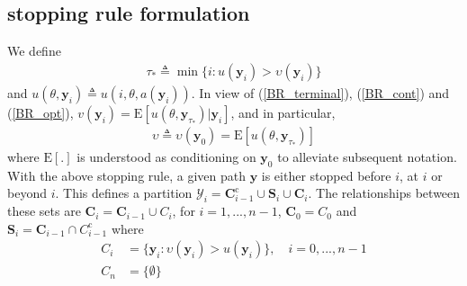 \documentclass{article}
\begin{document}
\subsection{stopping rule formulation}
We define
\begin{align}\label{tau_*}
\tau_*\triangleq\min\{i: u(\mathbf{y}_i)>\upsilon(\mathbf{y}_i)\}
\end{align}and $u(\theta,\mathbf{y}_i)\triangleq
u(i,\theta,a(\mathbf{y}_i))$. In view of (\ref{BR_terminal}),
(\ref{BR_cont}) and (\ref{BR_opt}),
$v(\mathbf{y}_i)=\mathrm{E}[u(\theta,\mathbf{y}_{\tau_*})|\mathbf{y}_i]$,
and in particular,
\begin{eqnarray}\label{opt_cont}
\upsilon\triangleq\upsilon(\mathbf{y}_0)=\mathrm{E}[u(\theta,\mathbf{y}_{\tau_*})]
\end{eqnarray}where $\mathrm{E}[.]$ is understood as conditioning on
$\mathbf{y}_0$ to alleviate subsequent notation. With the above
stopping rule, a given path $\mathbf{y}$ is either stopped before
$i$, at $i$ or beyond $i$. This defines a partition
$\boldsymbol{\mathcal{Y}}_i=\mathbf{C}_{i-1}^{\mathrm{c}}\cup\mathbf{S}_i
\cup \mathbf{C}_i$. The relationships between these sets are
$\mathbf{C}_i=\mathbf{C}_{i-1}\cup C_{i}$, for $i=1,...,n-1$,
$\mathbf{C}_0=C_{0}$ and $\mathbf{S}_i=\mathbf{C}_{i-1}\cap
C_{i-1}^{\mathrm{c}}$ where
\begin{align}\label{C_i} C_i &=\{\mathbf{y}_{i}:
\upsilon(\mathbf{y}_i)>u(\mathbf{y}_i)\}, \quad
i=0,...,n-1\\\label{C_0} C_{n}&=\{\emptyset\}
\end{align}
\end{document}
